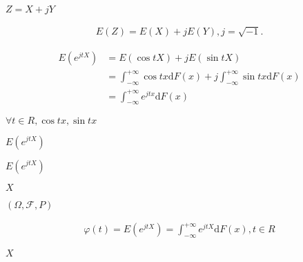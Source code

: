 \begin{preview}
\setcounter{equation}{0}%
\(Z = X + jY\)
\end{preview}

\begin{preview}
\setcounter{equation}{0}%
\begin{align}
  E(Z) = E(X) + j E(Y), j = \sqrt{-1}.
\end{align}

\end{preview}

\begin{preview}
\setcounter{equation}{0}%
\begin{align}
  E(e^{jtX}) &= E(\cos{t}X) + jE(\sin{t}X)\\
&=\int^{+\infty}_{-\infty} \cos{tx}  \mathrm{d}F(x) + j\int^{+\infty}_{-\infty} \sin{tx}\mathrm{d}F(x)\\
&=\int^{+\infty}_{-\infty} e^{jtx}\mathrm{d}F(x)
\end{align}

\end{preview}

\begin{preview}
\setcounter{equation}{0}%
\(\forall t \in R, \cos{t}x, \sin{t}x\)
\end{preview}

\begin{preview}
\setcounter{equation}{0}%
\(E(e^{jtX})\)
\end{preview}

\begin{preview}
\setcounter{equation}{0}%
\(E(e^{jtX})\)
\end{preview}

\begin{preview}
\setcounter{equation}{0}%
\(X\)
\end{preview}

\begin{preview}
\setcounter{equation}{0}%
\((\Omega, \mathcal{F}, P)\)
\end{preview}

\begin{preview}
\setcounter{equation}{0}%
\begin{align}
  \varphi(t) = E(e^{jtX}) = \int^{+\infty}_{-\infty} e^{jtX} \mathrm{d}F(x), t\in R
\end{align}

\end{preview}

\begin{preview}
\setcounter{equation}{0}%
\(X\)
\end{preview}

